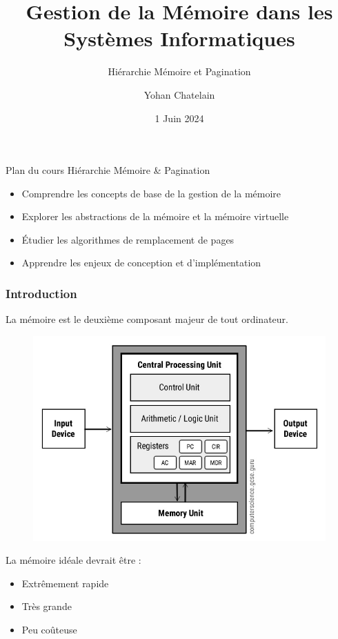 \documentclass[10pt]{beamer}
\title{Gestion de la Mémoire dans les Systèmes Informatiques}
\subtitle{Hiérarchie Mémoire et Pagination}
\author{Yohan Chatelain}
\institute{Polytechnique Montr\'eal}
\date{1 Juin 2024}
\begin{document}
\begin{frame}
    \titlepage
\end{frame}

\begin{frame}{Plan du cours}
    Hiérarchie Mémoire \& Pagination
    \begin{itemize}
        \item Comprendre les concepts de base de la gestion de la mémoire
        \item Explorer les abstractions de la mémoire et la mémoire virtuelle
        \item Étudier les algorithmes de remplacement de pages
        \item Apprendre les enjeux de conception et d'implémentation
    \end{itemize}
\end{frame}

\begin{frame}
    \frametitle{Introduction}
    La mémoire est le deuxième composant majeur de tout ordinateur.
    \begin{figure}
        \centering

        \includegraphics[width=.45\textwidth]{figures/Von-Neumann-Architecture-Diagram.jpg}
        \label{fig:sub1}
    \end{figure}
    \begin{block}{La mémoire idéale devrait être :}
        \begin{itemize}
            \item Extrêmement rapide
            \item Très grande
            \item Peu coûteuse
        \end{itemize}
    \end{block}

\end{frame}
\end{document}
